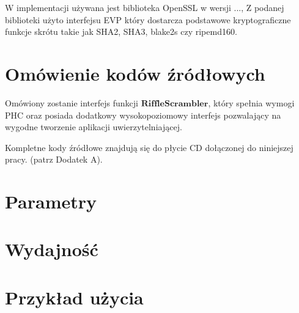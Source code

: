 W implementacji używana jest biblioteka OpenSSL w wersji ...,
Z podanej biblioteki użyto interfejsu EVP który dostarcza podstawowe kryptograficzne funkcje skrótu takie jak SHA2, SHA3, blake2s czy ripemd160.


\section{Omówienie kodów źródłowych}
Omówiony zostanie interfejs funkcji $\mathbf{RiffleScrambler}$, który spełnia wymogi PHC oraz posiada dodatkowy wysokopoziomowy interfejs pozwalający na wygodne tworzenie aplikacji uwierzytelniającej.

Kompletne kody źródłowe znajdują się do płycie CD dołączonej do niniejszej pracy. (patrz Dodatek A).



\section{Parametry}


\section{Wydajność}


\section{Przykład użycia}


